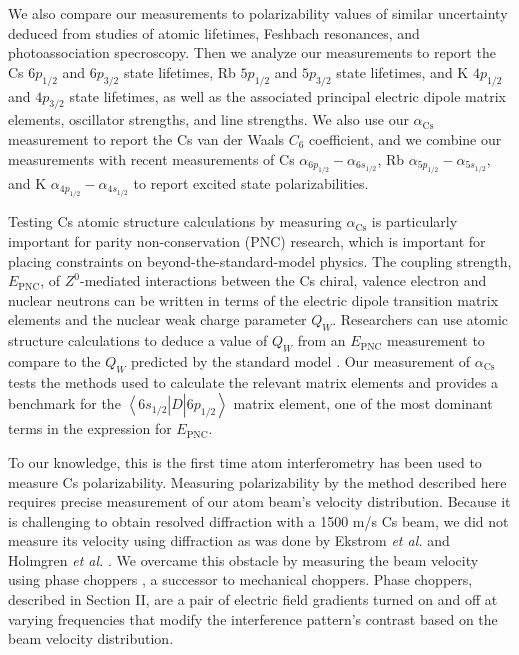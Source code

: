 \documentclass[twocolumn,prl,showpacs,superscriptaddress]{revtex4-1}   %
\newcommand{\brakett}[3]{\left\langle #1 \right|#2\left| #3 \right\rangle}
\newcommand{\acs}{\alpha_{\textrm{Cs}}}
\newcommand{\etalspace}{\textit{et al. }}
\begin{document}
We also compare our measurements to polarizability values of similar uncertainty deduced from studies of atomic lifetimes, Feshbach resonances, and photoassociation specroscopy. Then we analyze our measurements to report the Cs $6p_{1/2}$ and $6p_{3/2}$ state lifetimes, Rb $5p_{1/2}$ and $5p_{3/2}$ state lifetimes, and K $4p_{1/2}$ and $4p_{3/2}$ state lifetimes, as well as the associated principal electric dipole matrix elements, oscillator strengths, and line strengths. 
We also use our $\acs$ measurement to report the Cs van der Waals $C_6$ coefficient,
and we combine our measurements with recent measurements of 
Cs $\alpha_{6p_{1/2}} - \alpha_{6s_{1/2}}$,
Rb $\alpha_{5p_{1/2}} - \alpha_{5s_{1/2}}$, and
K $\alpha_{4p_{1/2}} - \alpha_{4s_{1/2}}$ to report excited state polarizabilities.

Testing Cs atomic structure calculations by measuring $\acs$ is particularly important for parity non-conservation (PNC) research, which is important for placing constraints on beyond-the-standard-model physics. The coupling strength, $E_{\mathrm{PNC}}$, of $Z^0$-mediated interactions between the Cs chiral, valence electron and nuclear neutrons can be written in terms of the electric dipole transition matrix elements and the nuclear weak charge parameter $Q_W$. Researchers can use atomic structure calculations to deduce a value of $Q_W$ from an $E_{\mathrm{PNC}}$ measurement \cite{Cho1997} to compare to the $Q_W$ predicted by the standard model \cite{Bouchiat1999,Dzuba2012}. Our measurement of $\acs$ tests the methods used to calculate the relevant matrix elements and provides a benchmark for the $\brakett{6s_{1/2}}{\hat{D}}{6p_{1/2}}$ matrix element, one of the most dominant terms in the expression for $E_{\mathrm{PNC}}$.

To our knowledge, this is the first time atom interferometry has been used to measure Cs polarizability. Measuring polarizability by the method described here requires precise measurement of our atom beam's velocity distribution. Because it is challenging to obtain resolved diffraction with a 1500 m/s Cs beam, we did not measure its velocity using diffraction as was done by Ekstrom \etalspace and Holmgren \etalspace \cite{Ekstrom1995,Holmgren2010}. We overcame this obstacle by measuring the beam velocity using phase choppers \cite{Roberts2002,Roberts2004,Holmgren2011,Hromada2014}, a successor to mechanical choppers.
Phase choppers, described in Section II, are a pair of electric field gradients turned on and off at varying frequencies that modify the interference pattern's contrast based on the beam velocity distribution. 
\end{document}
